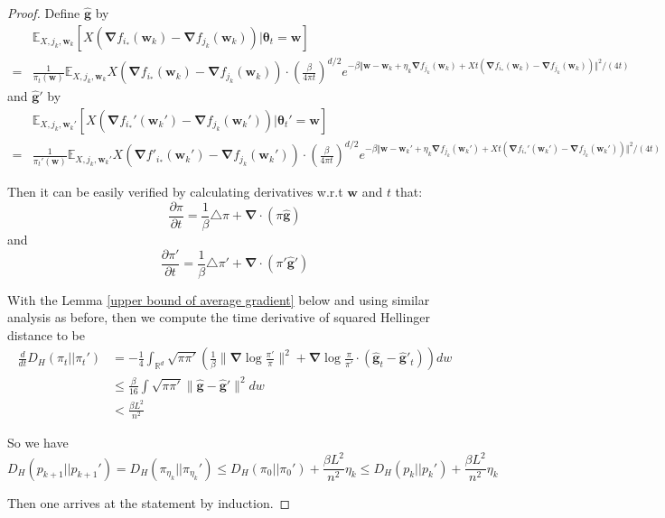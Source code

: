 \documentclass[final,12pt]{colt2018} %
\begin{document}
\begin{proof}
Define $\hat{\bm{g}}$ by
\begin{equation}
\begin{split}
\label{define_g}
  &\mathbb{E}_{X,j_k,\bm{w}_k}[X(\bm{\nabla} f_{i_*}(\bm{w}_k)-\bm{\nabla} f_{j_k}(\bm{w}_k))|\bm{\theta}_t=\bm{w}]\\
  =&\frac{1}{\pi_t(\bm{w})}\mathbb{E}_{X,j_k,\bm{w}_k} X(\bm{\nabla} f_{i_*}(\bm{w}_k)-\bm{\nabla} f_{j_k}(\bm{w}_k)) \cdot\left(\frac{\beta}{4\pi t}\right)^{d/2}e^{-\beta\Vert\bm{w}-\bm{w}_k+\eta_k\bm{\nabla}f_{j_k}(\bm{w}_k)+Xt(\bm{\nabla} f_{i_*}(\bm{w}_k)-\bm{\nabla} f_{j_k}(\bm{w}_k))\Vert^2/(4 t)}
\end{split}
\end{equation}
and $\hat{\bm{g}}'$ by
\begin{equation}
\begin{split}
\label{define_g'}
  &\mathbb{E}_{X,j_k,\bm{w}_k'}[X(\bm{\nabla} f_{i_*}'(\bm{w}_k')-\bm{\nabla} f_{j_k}(\bm{w}_k'))|\bm{\theta}_t'=\bm{w}]\\
  =&\frac{1}{\pi_t'(\bm{w})}\mathbb{E}_{X,j_k,\bm{w}_k'} X(\bm{\nabla} f'_{i_*}(\bm{w}_k')-\bm{\nabla} f_{j_k}(\bm{w}_k')) \cdot\left(\frac{\beta}{4\pi t}\right)^{d/2}e^{-\beta\Vert\bm{w}-\bm{w}_k'+\eta_k\bm{\nabla}f_{j_k}(\bm{w}_k')+Xt(\bm{\nabla} f_{i_*}'(\bm{w}_k')-\bm{\nabla} f_{j_k}(\bm{w}_k'))\Vert^2/(4 t)}
\end{split}
\end{equation}

Then it can be easily verified by calculating derivatives w.r.t $\bm{w}$ and $t$ that:
\begin{equation}
    \frac{\partial \pi}{\partial t}= \frac{1}{ \beta}\triangle \pi+\bm{\nabla}\cdot(\pi \hat{\bm{g}})
  \end{equation}
  and
  \begin{equation}
    \frac{\partial \pi'}{\partial t}= \frac{1}{\beta}\triangle \pi'+\bm{\nabla}\cdot(\pi' \hat{\bm{g}}')
  \end{equation}

With the Lemma \ref{upper bound of average gradient} below and using similar analysis as before, then we compute the time derivative of squared Hellinger distance to be
\begin{align*}
\frac{d}{dt}D_H(\pi_t||\pi_t')&=-\frac{1}{4}\int_{\mathbb{R}^d}\sqrt{\pi \pi'}\left(\frac{1}{\beta}\|\bm{\nabla}\log\frac{\pi'}{\pi}\|^2+\bm{\nabla}\log\frac{\pi}{\pi'}\cdot(\hat{\bm{g}}_t-\hat{\bm{g}}'_t)\right)dw\\
&\le \frac{\beta}{16}\int \sqrt{\pi \pi'}\|\hat{\bm{g}}-\hat{\bm{g}}'\|^2dw\\
&<\frac{\beta L^2}{n^2}
\end{align*}

So we have
\begin{equation}
  D_H(p_{k+1}||p_{k+1}')= D_H(\pi_{\eta_k}||\pi_{\eta_k}')\le D_H(\pi_0||\pi_0')+\frac{\beta L^2}{n^2}\eta_k\le D_H(p_k||p_k')+\frac{\beta L^2}{n^2}\eta_k
\end{equation}

Then one arrives at the statement by induction.
\end{proof}
\end{document}
